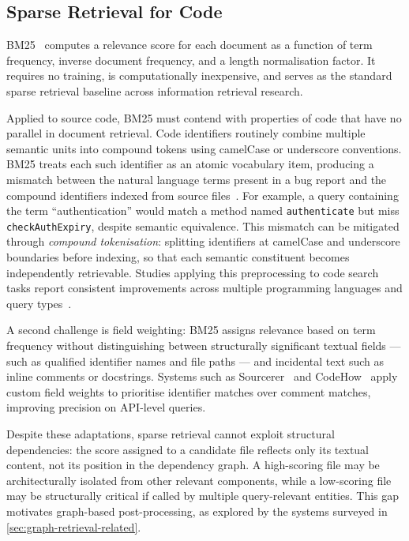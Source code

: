 \subsection{Sparse Retrieval for Code}
\label{sec:bm25-related}

BM25~\cite{bm25} computes a relevance score for each document as a function of term
frequency, inverse document frequency, and a length normalisation factor.
It requires no training, is computationally inexpensive, and serves as the standard
sparse retrieval baseline across information retrieval research.

Applied to source code, BM25 must contend with properties of code that have no parallel
in document retrieval.
Code identifiers routinely combine multiple semantic units into compound tokens using
camelCase or underscore conventions.
BM25 treats each such identifier as an atomic vocabulary item, producing a mismatch
between the natural language terms present in a bug report and the compound identifiers
indexed from source files~\cite{sourcerer}.
For example, a query containing the term ``authentication'' would match a method named
\texttt{authenticate} but miss \texttt{checkAuthExpiry}, despite semantic equivalence.
This mismatch can be mitigated through \emph{compound tokenisation}: splitting identifiers
at camelCase and underscore boundaries before indexing, so that each semantic constituent
becomes independently retrievable.
Studies applying this preprocessing to code search tasks report consistent improvements
across multiple programming languages and query types~\cite{codehow}.

A second challenge is field weighting: BM25 assigns relevance based on term frequency
without distinguishing between structurally significant textual fields — such as qualified
identifier names and file paths — and incidental text such as inline comments or
docstrings.
Systems such as Sourcerer~\cite{sourcerer} and CodeHow~\cite{codehow} apply custom field
weights to prioritise identifier matches over comment matches, improving precision on
API-level queries.

Despite these adaptations, sparse retrieval cannot exploit structural dependencies: the
score assigned to a candidate file reflects only its textual content, not its position
in the dependency graph.
A high-scoring file may be architecturally isolated from other relevant components, while
a low-scoring file may be structurally critical if called by multiple query-relevant
entities.
This gap motivates graph-based post-processing, as explored by the systems surveyed
in \cref{sec:graph-retrieval-related}.


